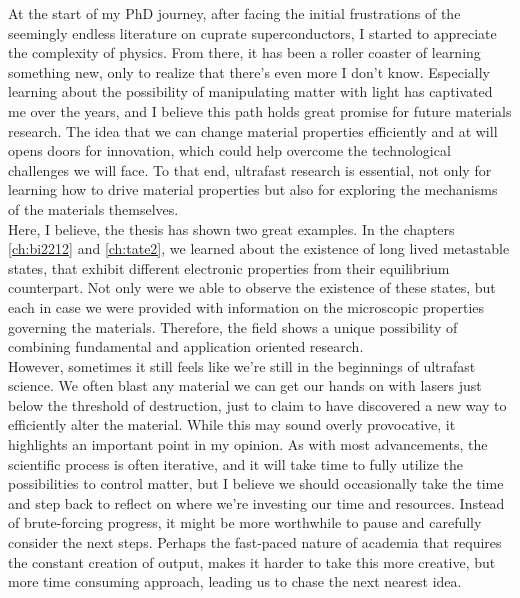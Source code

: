 At the start of my PhD journey, after facing the initial frustrations of the seemingly endless literature on cuprate superconductors, I started to appreciate the complexity of physics.
From there, it has been a roller coaster of learning something new, only to realize that there’s even more I don’t know.
Especially learning about the possibility of manipulating matter with light has captivated me over the years, and I believe this path holds great promise for future materials research.
The idea that we can change material properties efficiently and at will opens doors for innovation, which could help overcome the technological challenges we will face.
To that end, ultrafast research is essential, not only for learning how to drive material properties but also for exploring the mechanisms of the materials themselves.\\
Here, I believe, the thesis has shown two great examples.
In the chapters \ref{ch:bi2212} and \ref{ch:tate2}, we learned about the existence of long lived metastable states, that exhibit different electronic properties from their equilibrium counterpart.
Not only were we able to observe the existence of these states, but each in case we were provided with information on the microscopic properties governing the materials.
Therefore, the field shows a unique possibility of combining fundamental and application oriented research.\\
However, sometimes it still feels like we're still in the beginnings of ultrafast science.
We often blast any material we can get our hands on with lasers just below the threshold of destruction, just to claim to have discovered a new way to efficiently alter the material.
While this may sound overly provocative, it highlights an important point in my opinion.
As with most advancements, the scientific process is often iterative, and it will take time to fully utilize the possibilities to control matter, but I believe we should occasionally take the time and step back to reflect on where we’re investing our time and resources.
Instead of brute-forcing progress, it might be more worthwhile to pause and carefully consider the next steps.
Perhaps the fast-paced nature of academia that requires the constant creation of output, makes it harder to take this more creative, but more time consuming approach, leading us to chase the next nearest idea.\hfill\break

